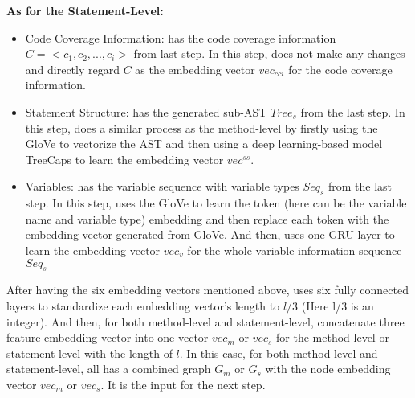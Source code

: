 {\bf As for the Statement-Level:}
\begin{itemize}
	\item Code Coverage Information: \tool has the code coverage information $C = <c_1, c_2, ..., c_i>$ from last step. In this step, \tool does not make any changes and directly regard $C$ as the embedding vector $vec_{cci}$ for the code coverage information.
	
	\item Statement Structure: \tool has the generated sub-AST $Tree_s$ from the last step. In this step, \tool does a similar process as the method-level by firstly using the GloVe to vectorize the AST and then using a deep learning-based model TreeCaps to learn the embedding vector $vec^{ss}$.
	
	\item Variables: \tool has the variable sequence with variable types $Seq_s$ from the last step. In this step, \tool uses the GloVe to learn the token (here can be the variable name and variable type) embedding and then replace each token with the embedding vector generated from GloVe. And then, \tool uses one GRU layer to learn the embedding vector $vec_{v}$ for the whole variable information sequence $Seq_s$
\end{itemize}

After having the six embedding vectors mentioned above, \tool uses six fully connected layers to standardize each embedding vector's length to $l/3$ (Here l/3 is an integer). And then, for both method-level and statement-level, \tool concatenate three feature embedding vector into one vector $vec_{m}$ or $vec_{s}$ for the method-level or statement-level with the length of $l$. In this case, for both method-level and statement-level, \tool all has a combined graph $G_m$ or $G_s$ with the node embedding vector $vec_{m}$ or $vec_{s}$. It is the input for the next step.
